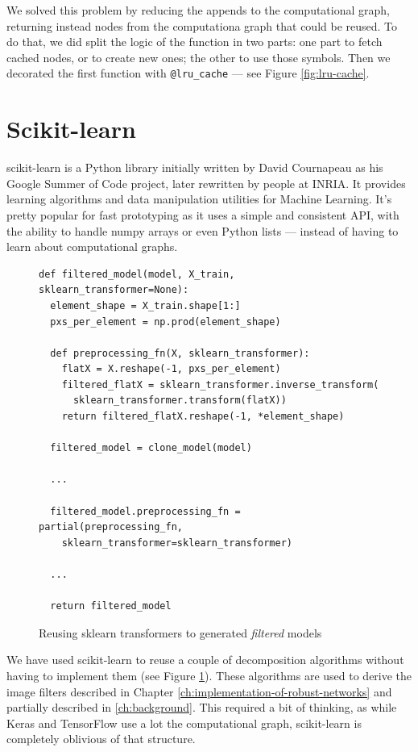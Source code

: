 We solved this problem by reducing the appends to the computational
graph, returning instead nodes from the computationa graph that could
be reused. To do that, we did split the logic of the function in two
parts: one part to fetch cached nodes, or to create new ones; the other
to use those symbols. Then we decorated the first function with
\texttt{@lru\_cache} --- see Figure \ref{fig:lru-cache}.

\section{Scikit-learn}
\label{sec:sklearn}

scikit-learn is a Python library initially written by David Cournapeau
as his Google Summer of Code project, later rewritten by people at
INRIA. It provides learning algorithms and data manipulation utilities
for Machine Learning. It's pretty popular for fast prototyping as it
uses a simple and consistent API, with the ability to handle numpy
arrays or even Python lists --- instead of having to learn about
computational graphs.

\begin{figure}
  \begin{verbatim}
def filtered_model(model, X_train, sklearn_transformer=None):
  element_shape = X_train.shape[1:]
  pxs_per_element = np.prod(element_shape)

  def preprocessing_fn(X, sklearn_transformer):
    flatX = X.reshape(-1, pxs_per_element)
    filtered_flatX = sklearn_transformer.inverse_transform(
      sklearn_transformer.transform(flatX))
    return filtered_flatX.reshape(-1, *element_shape)

  filtered_model = clone_model(model)

  ...

  filtered_model.preprocessing_fn = partial(preprocessing_fn,
    sklearn_transformer=sklearn_transformer)

  ...

  return filtered_model
  \end{verbatim}
  \caption{Reusing sklearn transformers to generated \emph{filtered} models}
  \label{fig:sklearn-code}
\end{figure}

We have used scikit-learn to reuse a couple of decomposition algorithms
without having to implement them (see Figure \ref{fig:sklearn-code}).
These algorithms are used to derive the image filters described in
Chapter \ref{ch:implementation-of-robust-networks} and partially
described in \ref{ch:background}. This required a bit of thinking, as
while Keras and TensorFlow use a lot the computational graph,
scikit-learn is completely oblivious of that structure.

